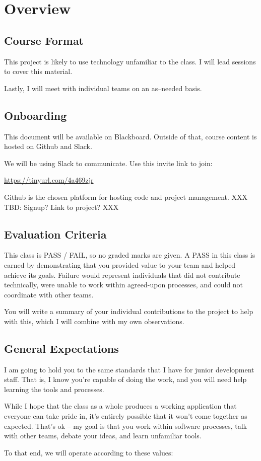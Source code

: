 \documentclass{article}
\newcommand{\enterProblemHeader}[1]{
}
\newcommand{\exitProblemHeader}[1]{
\nobreak\extramarks{#1}{}\nobreak
}
\newcounter{homeworkProblemCounter} %
\newcommand{\homeworkProblemName}{}
\newenvironment{homeworkProblem}[1][Problem \arabic{homeworkProblemCounter}]{ %
\stepcounter{homeworkProblemCounter} %
\renewcommand{\homeworkProblemName}{#1} %
\section{\homeworkProblemName} %
\enterProblemHeader{\homeworkProblemName} %
}{
\exitProblemHeader{\homeworkProblemName} %
}
\newcommand{\homeworkSectionName}{}
\newenvironment{homeworkSection}[1]{ %
\renewcommand{\homeworkSectionName}{#1} %
\subsection{\homeworkSectionName} %
\enterProblemHeader{\homeworkProblemName\ [\homeworkSectionName]} %
}{
\enterProblemHeader{\homeworkProblemName} %
}
\begin{document}
\begin{homeworkProblem}[Overview]
\begin{homeworkSection}{Course Format}
	This project is likely to use technology unfamiliar to the class. I will lead sessions to cover this material.

	Lastly, I will meet with individual teams on an as--needed basis.
\end{homeworkSection}

\begin{homeworkSection}{Onboarding}
	This document will be available on Blackboard. Outside of that, course content is hosted on Github and Slack.

	We will be using Slack to communicate. Use this invite link to join:

	\begin{center}
		\url{https://tinyurl.com/4a469zjr}
	\end{center}

	Github is the chosen platform for hosting code and project management. XXX TBD: Signup? Link to project? XXX
	
\end{homeworkSection}

\begin{homeworkSection}{Evaluation Criteria}
	This class is PASS / FAIL, so no graded marks are given. A PASS in this class is earned by demonstrating that you provided value to your team and helped achieve its goals. Failure would represent individuals that did not contribute technically, were unable to work within agreed-upon processes, and could not coordinate with other teams.
	
	You will write a summary of your individual contributions to the project to help with this, which I will combine with my own observations.
\end{homeworkSection}


\begin{homeworkSection}{General Expectations}
	I am going to hold you to the same standards that I have for junior development staff. That is, I know you're capable of doing the work, and you will need help learning the tools and processes.

	While I hope that the class as a whole produces a working application that everyone can take pride in, it's entirely possible that it won't come together as expected. That's ok -- my goal is that you work within software processes, talk with other teams, debate your ideas, and learn unfamiliar tools.

	To that end, we will operate according to these values:


\end{homeworkSection}
\end{homeworkProblem}
\end{document}
